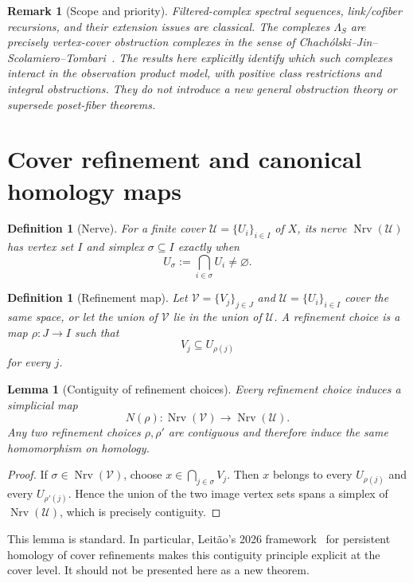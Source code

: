 \documentclass[11pt]{article}
\newtheorem{lemma}[theorem]{Lemma}
\newtheorem{definition}[theorem]{Definition}
\newtheorem{remark}[theorem]{Remark}
\newcommand{\Nrv}{\operatorname{Nrv}}
\begin{document}
\begin{remark}[Scope and priority]
Filtered-complex spectral sequences, link/cofiber recursions, and their
extension issues are classical.  The complexes $\Lambda_S$ are precisely
vertex-cover obstruction complexes in the sense of
Chach\'olski--Jin--Scolamiero--Tombari~\cite{ChacholskiEtAl2021}.
The results here explicitly identify which such complexes interact in
the observation product model, with positive class restrictions and
integral obstructions.  They do not introduce a new general obstruction
theory or supersede poset-fiber theorems.
\end{remark}


\section{Cover refinement and canonical homology maps}

\begin{definition}[Nerve]
For a finite cover $\mathcal U=\{U_i\}_{i\in I}$ of $X$, its nerve $\Nrv(\mathcal U)$ has vertex set $I$ and simplex $\sigma\subseteq I$ exactly when
\[
U_\sigma:=\bigcap_{i\in\sigma}U_i\neq\varnothing.
\]
\end{definition}

\begin{definition}[Refinement map]
Let $\mathcal V=\{V_j\}_{j\in J}$ and $\mathcal U=\{U_i\}_{i\in I}$ cover the same space, or let the union of $\mathcal V$ lie in the union of $\mathcal U$.  A refinement choice is a map $\rho:J\to I$ such that
\[
V_j\subseteq U_{\rho(j)}
\]
for every $j$.
\end{definition}

\begin{lemma}[Contiguity of refinement choices]\label{lem:contiguity}
Every refinement choice induces a simplicial map
\[
N(\rho):\Nrv(\mathcal V)\to\Nrv(\mathcal U).
\]
Any two refinement choices $\rho,\rho'$ are contiguous and therefore induce the same homomorphism on homology.
\end{lemma}
\begin{proof}
If $\sigma\in\Nrv(\mathcal V)$, choose $x\in\bigcap_{j\in\sigma}V_j$.  Then $x$ belongs to every $U_{\rho(j)}$ and every $U_{\rho'(j)}$.  Hence the union of the two image vertex sets spans a simplex of $\Nrv(\mathcal U)$, which is precisely contiguity.
\end{proof}

This lemma is standard.  In particular, Leit\~ao's 2026 framework~\cite{Leitao2026} for persistent homology of cover refinements makes this contiguity principle explicit at the cover level.  It should not be presented here as a new theorem.
\end{document}
